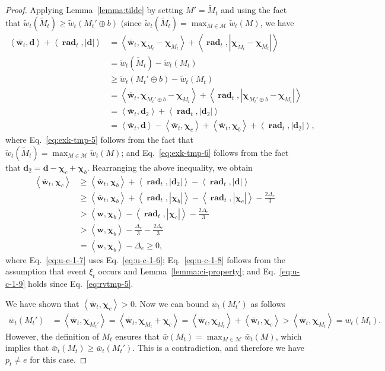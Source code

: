\documentclass{article}
\newcommand{\M}{\mathcal M}
\DeclareMathOperator{\rad}{rad}
\newcommand{\inn}[1]{\left\langle #1 \right\rangle}
\renewcommand{\vec}[1]{\boldsymbol{#1}}
\begin{document}
\begin{proof}
Applying Lemma~\ref{lemma:tilde} by setting $M' = \tilde M_t$ and using the fact that $\tilde w_t(\tilde M_t) \ge \tilde w_t(M_t' \oplus b)$ (since $\tilde w_t(\tilde M_t) = \max_{M\in \M} \tilde w_t(M)$, we have 
\begin{align}
\inn{\vec {\bar w}_t, \vec d}+\inn{\vec \rad_t, |\vec d|}
& = \inn{\vec {\bar w}_t, \vec \chi_{\tilde M_t}-\vec\chi_{M_t}}+\inn{\vec \rad_t, |\vec \chi_{\tilde M_t}-\vec\chi_{M_t}|}\nonumber\\
& = \tilde w_t(\tilde M_t)- \tilde w_t(M_t)\nonumber\\
& \ge \tilde w_t(M_t'\oplus b) - \tilde w_t(M_t)\label{eq:exk-tmp-5}\\
&= \inn{\vec {\bar w}_t, \vec \chi_{M_t' \oplus b}-\vec\chi_{M_t}}+\inn{\vec \rad_t, |\vec \chi_{M_t' \oplus b}-\vec\chi_{M_t}|}\nonumber\\
&= \inn{\vec {\bar w}_t, \vec d_2}+\inn{\vec \rad_t, |\vec d_2|}\nonumber \\
&= \inn{\vec {\bar w}_t, \vec d}-\inn{\vec {\bar w}_t, \vec \chi_c}+\inn{\vec {\bar w}_t,\vec\chi_b}+\inn{\vec \rad_t, |\vec d_2|},\label{eq:exk-tmp-6}
\end{align}
where Eq.~\eqref{eq:exk-tmp-5} follows from the fact that $\tilde w_t(\tilde M_t) = \max_{M\in \M} \tilde w_t(M)$;
and Eq.~\eqref{eq:exk-tmp-6} follows from the fact that $\vec d_2 = \vec d-\vec \chi_{c}+\vec \chi_{b}$.
Rearranging the above inequality, we obtain
\begin{align}
\inn{\vec {\bar w}_t, \vec \chi_c} &\ge \inn{\vec {\bar w}_t, \vec \chi_b}+\inn{\vec \rad_t, |\vec d_2|}-\inn{\vec \rad_t, |\vec d|}\nonumber \\
&\ge  \inn{\vec {\bar w}_t, \vec \chi_b}+
\left\langle \vec \rad_t, |\vec\chi_b| \right\rangle
  -\left\langle \vec \rad_t, |\vec\chi_c| \right\rangle
  -\frac{2\Delta_e}{3} \label{eq:u-c-1-7}\\
&> \inn{\vec w, \vec \chi_b}-\inn{\vec \rad_t, |\vec \chi_c|}-\frac{2\Delta_e}{3} \label{eq:u-c-1-8}\\
&> \inn{\vec w, \vec \chi_b}-\frac{\Delta_e}{3}-\frac{2\Delta_e}{3} \label{eq:u-c-1-9}\\
&= \inn{\vec w, \vec \chi_b}-\Delta_e \ge 0,
\end{align}
where Eq.~\eqref{eq:u-c-1-7} uses Eq.~\eqref{eq:u-c-1-6}; 
Eq.~\eqref{eq:u-c-1-8} follows from the assumption that event $\xi_t$ occurs and Lemma~\ref{lemma:ci-property};
and Eq.~\eqref{eq:u-c-1-9} holds since Eq.~\eqref{eq:rvtmp-5}.

We have shown that $\inn{\vec {\bar w}_t,\vec \chi_c}>0$. Now we can bound $\bar w_t(M_t')$ as follows
\begin{align*}
 \bar w_t(M_t') &= \inn{\vec {\bar w}_t, \vec \chi_{M_t'}} = \inn{\vec {\bar w}_t, \vec \chi_{M_t}+\vec \chi_c} =
 \inn{\vec {\bar w}_t, \vec \chi_{M_t}}+\inn{\vec {\bar w}_t, \vec \chi_c} > \inn{\vec {\bar w}_t, \vec \chi_{M_t}} = w_t(M_t).
\end{align*}
However, the definition of $M_t$ ensures that $\bar w(M_t) = \max_{M\in\M} \bar w_t(M)$, which implies that $\bar w_t(M_t) \ge \bar w_t(M_t')$. 
This is a contradiction, and therefore we have $p_t \not=e$ for this case.


\end{proof}
\end{document}
